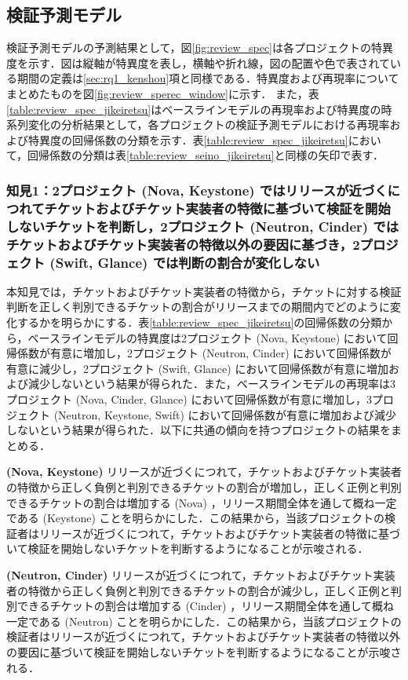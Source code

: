 \documentclass[11pt]{jreport}
\begin{document}
\subsection{検証予測モデル}
検証予測モデルの予測結果として，図\ref{fig:review_spec}は各プロジェクトの特異度を示す．図は縦軸が特異度を表し，横軸や折れ線，図の配置や色で表されている期間の定義は\ref{sec:rq1_kenshou}項と同様である．特異度および再現率についてまとめたものを図\ref{fig:review_sperec_window}に示す．
また，表\ref{table:review_spec_jikeiretsu}はベースラインモデルの再現率および特異度の時系列変化の分析結果として，各プロジェクトの検証予測モデルにおける再現率および特異度の回帰係数の分類を示す．表\ref{table:review_spec_jikeiretsu}において，回帰係数の分類は表\ref{table:review_seino_jikeiretsu}と同様の矢印で表す．

\subsubsection{知見1：2プロジェクト (Nova, Keystone) ではリリースが近づくにつれてチケットおよびチケット実装者の特徴に基づいて検証を開始しないチケットを判断し，2プロジェクト (Neutron, Cinder) ではチケットおよびチケット実装者の特徴以外の要因に基づき，2プロジェクト (Swift, Glance) では判断の割合が変化しない}
本知見では，チケットおよびチケット実装者の特徴から，チケットに対する検証判断を正しく判別できるチケットの割合がリリースまでの期間内でどのように変化するかを明らかにする．表\ref{table:review_spec_jikeiretsu}の回帰係数の分類から，ベースラインモデルの特異度は2プロジェクト (Nova, Keystone) において回帰係数が有意に増加し，2プロジェクト (Neutron, Cinder) において回帰係数が有意に減少し，2プロジェクト (Swift, Glance) において回帰係数が有意に増加および減少しないという結果が得られた．また，ベースラインモデルの再現率は3プロジェクト (Nova, Cinder, Glance) において回帰係数が有意に増加し，3プロジェクト (Neutron, Keystone, Swift) において回帰係数が有意に増加および減少しないという結果が得られた．以下に共通の傾向を持つプロジェクトの結果をまとめる．

\textbf{ (Nova, Keystone) }リリースが近づくにつれて，チケットおよびチケット実装者の特徴から正しく負例と判別できるチケットの割合が増加し，正しく正例と判別できるチケットの割合は増加する (Nova) ，リリース期間全体を通して概ね一定である (Keystone) ことを明らかにした．この結果から，当該プロジェクトの検証者はリリースが近づくにつれて，チケットおよびチケット実装者の特徴に基づいて検証を開始しないチケットを判断するようになることが示唆される．

\textbf{ (Neutron, Cinder) }リリースが近づくにつれて，チケットおよびチケット実装者の特徴から正しく負例と判別できるチケットの割合が減少し，正しく正例と判別できるチケットの割合は増加する (Cinder) ，リリース期間全体を通して概ね一定である (Neutron) ことを明らかにした．この結果から，当該プロジェクトの検証者はリリースが近づくにつれて，チケットおよびチケット実装者の特徴以外の要因に基づいて検証を開始しないチケットを判断するようになることが示唆される．
\end{document}
